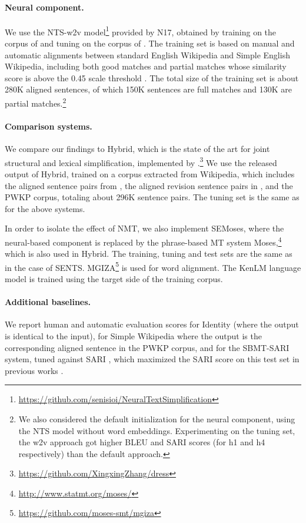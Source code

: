 \documentclass[11pt,a4paper]{article}
\begin{document}
\paragraph{Neural component.}
We use the NTS-w2v model\footnote{\url{https://github.com/senisioi/NeuralTextSimplification}} provided by N17, obtained by training on the corpus of \citet{H15} and tuning on the corpus of \citet{Xu16}. The training set is based on manual and automatic alignments between standard English Wikipedia and Simple English Wikipedia, including both good matches and partial matches whose similarity score is above the 0.45 scale threshold \citep{H15}. The total size of the training set is about 280K aligned sentences, of
which 150K sentences are full matches and 130K are partial matches.\footnote{We also considered the default initialization for the neural component, using the NTS model without word embeddings. Experimenting on the tuning set, the w2v approach got higher BLEU and SARI scores (for h1 and h4 respectively) than the default approach.}

\vspace{-0.2cm}
\paragraph{Comparison systems.}
We compare our findings to {\sc Hybrid}, which is the state of the art for joint structural and lexical simplification, 
implemented by \citet{ZL17}.\footnote{\url{ https://github.com/XingxingZhang/dress}}
We use the released output of {\sc Hybrid}, trained on a corpus extracted from Wikipedia, which includes the aligned sentence pairs from \citet{K13}, 
the aligned revision sentence pairs in \citet{WL11}, and the PWKP corpus, totaling about 296K sentence pairs. 
The tuning set is the same as for the above systems.

In order to isolate the effect of NMT, we also implement SEMoses, where the neural-based component is replaced by the phrase-based MT 
system Moses,\footnote{\url{ http://www.statmt.org/moses/}} which is also used in {\sc Hybrid}. 
The training, tuning and test sets are the same as in the case of SENTS. 
MGIZA\footnote{\url{ https://github.com/moses-smt/mgiza}} is used for word alignment. 
The KenLM language model is trained using the target side of the training corpus.

\vspace{-.2cm}
\paragraph{Additional baselines.}
We report human and automatic evaluation scores for Identity (where the output is identical to the input), for Simple Wikipedia where the output is the corresponding aligned sentence in the PWKP corpus, and for the SBMT-SARI system, 
tuned against SARI \citep{Xu16}, which 
maximized the SARI score on this test set in previous works \citep{Ni17,ZL17}.
\end{document}
